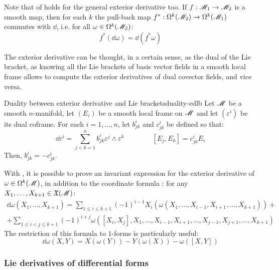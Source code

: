 Note that  of  holds for the general exterior derivative too. If $ f : \mathscr{M}_1 \rightarrow \mathscr{M}_2 $ is a smooth map, then for each $ k $ the pull-back map $ f^* : \Omega^{k}(\mathscr{M}_2) \rightarrow \Omega^{k}(\mathscr{M}_1) $ commutes with $ \dd $, i.e. for all $ \omega \in \Omega^{k}(\mathscr{M}_2) $:
\begin{equation}
  f^*(\dd \omega) = \dd (f^* \omega)
\end{equation}

The exterior derivative can be thought, in a certain sense, as the dual of the Lie bracket, as knowing all the Lie brackets of basis vector fields in a smooth local frame allows to compute the exterior derivatives of dual covector fields, and vice versa.

\begin{proposition}{Duality between exterior derivative and Lie brackets}{duality-edlb}
  Let $ \mathscr{M} $ be a smooth $ n $-manifold, let $ (E_i) $ be a smooth local frame on $ \mathscr{M} $ and let $ (\varepsilon^i) $ be its dual coframe. For each $ i = 1 , \dots  , n $, let $ b^i_{jk} $ and $ c^i_{jk} $ be defined so that:
  \begin{equation*}
    \dd \varepsilon^i = \sum_{j < k = 1}^n b^i_{jk} \varepsilon^j \wedge \varepsilon^k
    \qquad \qquad
    [E_j , E_k] = c^i_{jk} E_i
  \end{equation*}
  Then, $ b^i_{jk} = - c^i_{jk} $.
\end{proposition}

With , it is possible to prove an invariant expression for the exterior derivative of $ \omega \in \Omega^{k}(\mathscr{M}) $, in addition to the coordinate formula : for any $ X_1 , \dots , X_{k+1} \in \mathfrak{X}(\mathscr{M}) $:
\begin{multline}
  \dd \omega(X_1 , \dots , X_{k+1}) = \sum_{1 \leq i \leq k+1} (-1)^{i-1} X_i(\omega(X_1 , \dots , X_{i-1} , X_{i+1} , \dots , X_{k+1})) + \\
  + \sum_{1 \leq i < j \leq k+1} (-1)^{i+j} \omega([X_i , X_j] , X_1 , \dots , X_{i-1} , X_{i+1} , \dots , X_{j-1} , X_{j+1} , \dots , X_{k+1})
\end{multline}
The restriction of this formula to $ 1 $-forms is particularly useful:
\begin{equation}
  \dd \omega(X,Y) = X(\omega(Y)) - Y(\omega(X)) - \omega([X,Y])
\end{equation}

\subsubsection{Lie derivatives of differential forms}

